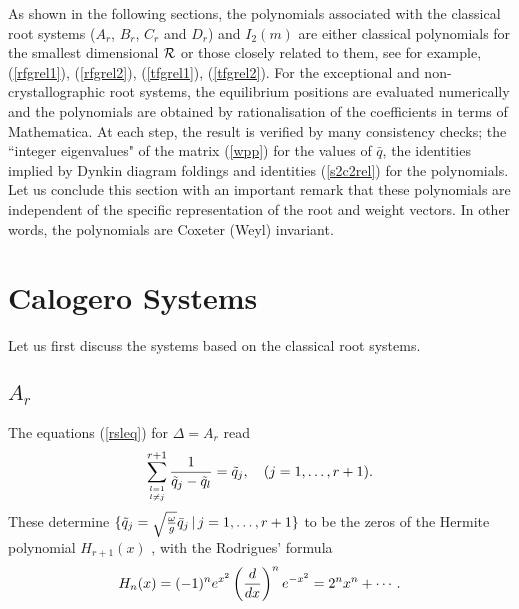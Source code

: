 \documentclass[a4paper,12pt]{article}
\begin{document}
As shown in the following sections, the polynomials associated with the
classical root systems ($A_r$, $B_r$, $C_r$ and $D_r$) and $I_2(m)$
are either classical polynomials for the smallest dimensional ${\cal R}$ or
those closely related to them, see for example, (\ref{rfgrel1}),
(\ref{rfgrel2}), (\ref{tfgrel1}), (\ref{tfgrel2}).
For the exceptional and non-crystallographic root systems, the equilibrium
positions are evaluated numerically and the polynomials are obtained by
rationalisation of the coefficients in terms of Mathematica.
At each step, the result is verified by many consistency checks;
the ``integer eigenvalues" of the matrix (\ref{wpp}) for the values of
$\bar{q}$, the identities implied by Dynkin diagram foldings and
identities (\ref{s2c2rel}) for the polynomials.
Let us conclude this section with an important remark that these polynomials
are independent of the specific representation of the root and weight vectors.
In other words, the polynomials are Coxeter (Weyl) invariant.

\section{Calogero Systems}
\label{calsys}
\setcounter{equation}{0}

Let us first discuss the systems based on the classical root systems.
\subsection{$A_r$}

The equations (\ref{rsleq}) for $\Delta=A_r$ read
\begin{equation}
   \sum_{l=1\atop l\ne j}^{r+1}{1\over{\tilde{q}_j-\tilde{q}_l}}=\tilde{q}_j,
   \quad (j=1,\ldots,r+1).
   \label{herroots}
\end{equation}
These determine $\{\tilde{q}_j=\sqrt{\omega\over g}\bar{q}_j\,|\,
j=1,\ldots,r+1\}$ to be the zeros of the Hermite polynomial $H_{r+1}(x)$
\cite{szego}, with the Rodrigues' formula
\begin{equation}
   H_n(x)=(-1)^ne^{x^2}\left({d\over{dx}}\right)^ne^{-x^2}
   =2^nx^n+\cdots.
\end{equation}
\end{document}

